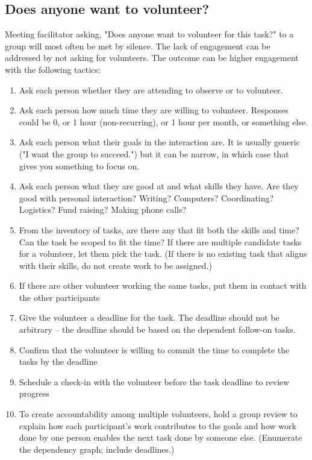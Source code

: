 \subsection{Does anyone want to volunteer?}


Meeting facilitator asking, "Does anyone want to volunteer for this task?" to a group will most often be met by silence. 
The lack of engagement can be addressed by not asking for volunteers. The outcome can be higher engagement with the following tactics:
\begin{enumerate}
    \item Ask each person whether they are attending to observe or to volunteer.
    \item Ask each person how much time they are willing to volunteer. Responses could be 0, or 1 hour (non-recurring), or 1 hour per month, or something else.
    \item Ask each person what their goals in the interaction are. It is usually generic ("I want the group to succeed.") but it can be narrow, in which case that gives you something to focus on.
    \item Ask each person what they are good at and what skills they have. Are they good with personal interaction? Writing? Computers? Coordinating? Logistics? Fund raising? Making phone calls?
    \item From the inventory of tasks, are there any that fit both the skills and time? Can the task be scoped to fit the time? If there are multiple candidate tasks for a volunteer, let them pick the task. (If there is no existing task that aligns with their skills, do not create work to be assigned.)
    \item If there are other volunteer working the same tasks, put them in contact with the other participants
    \item Give the volunteer a deadline for the task. The deadline should not be arbitrary -- the deadline should be based on the dependent follow-on tasks. 
    \item Confirm that the volunteer is willing to commit the time to complete the tasks by the deadline
    \item Schedule a check-in with the volunteer before the task deadline to review progress
    \item To create accountability among multiple volunteers, hold a group review to explain how each participant's work contributes to the goals and how work done by one person enables the next task done by someone else. (Enumerate the dependency graph; include deadlines.)
\end{enumerate}
